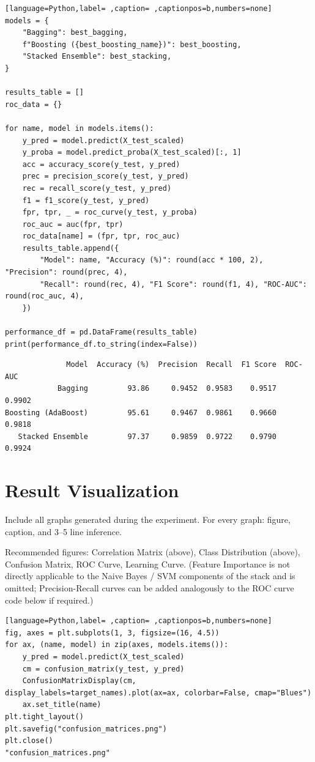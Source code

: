 \documentclass[12pt,a4paper]{article}
\begin{document}
\begin{lstlisting}[language=Python,label= ,caption= ,captionpos=b,numbers=none]
models = {
    "Bagging": best_bagging,
    f"Boosting ({best_boosting_name})": best_boosting,
    "Stacked Ensemble": best_stacking,
}

results_table = []
roc_data = {}

for name, model in models.items():
    y_pred = model.predict(X_test_scaled)
    y_proba = model.predict_proba(X_test_scaled)[:, 1]
    acc = accuracy_score(y_test, y_pred)
    prec = precision_score(y_test, y_pred)
    rec = recall_score(y_test, y_pred)
    f1 = f1_score(y_test, y_pred)
    fpr, tpr, _ = roc_curve(y_test, y_proba)
    roc_auc = auc(fpr, tpr)
    roc_data[name] = (fpr, tpr, roc_auc)
    results_table.append({
        "Model": name, "Accuracy (%)": round(acc * 100, 2), "Precision": round(prec, 4),
        "Recall": round(rec, 4), "F1 Score": round(f1, 4), "ROC-AUC": round(roc_auc, 4),
    })

performance_df = pd.DataFrame(results_table)
print(performance_df.to_string(index=False))
\end{lstlisting}

\begin{verbatim}
              Model  Accuracy (%)  Precision  Recall  F1 Score  ROC-AUC
            Bagging         93.86     0.9452  0.9583    0.9517   0.9902
Boosting (AdaBoost)         95.61     0.9467  0.9861    0.9660   0.9818
   Stacked Ensemble         97.37     0.9859  0.9722    0.9790   0.9924
\end{verbatim}

\section{Result Visualization}
\label{sec:orgc4d04e1}
Include all graphs generated during the experiment. For every graph: figure, caption, and 3--5
line inference.

Recommended figures: Correlation Matrix (above), Class Distribution (above), Confusion Matrix, ROC
Curve, Learning Curve. (Feature Importance is not directly applicable to the Naive Bayes / SVM
components of the stack and is omitted; Precision-Recall curves can be added analogously to the
ROC curve code below if required.)

\begin{lstlisting}[language=Python,label= ,caption= ,captionpos=b,numbers=none]
fig, axes = plt.subplots(1, 3, figsize=(16, 4.5))
for ax, (name, model) in zip(axes, models.items()):
    y_pred = model.predict(X_test_scaled)
    cm = confusion_matrix(y_test, y_pred)
    ConfusionMatrixDisplay(cm, display_labels=target_names).plot(ax=ax, colorbar=False, cmap="Blues")
    ax.set_title(name)
plt.tight_layout()
plt.savefig("confusion_matrices.png")
plt.close()
"confusion_matrices.png"
\end{lstlisting}
\end{document}
